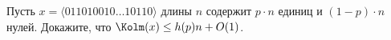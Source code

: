 Пусть $x = \langle{011010010 \dotso 10110}\rangle$ длины $n$ содержит $p \cdot n$ единиц и $(1 - p) \cdot
n$ нулей. Докажите, что $\Kolm(x) \le h(p) n + O(1)$.